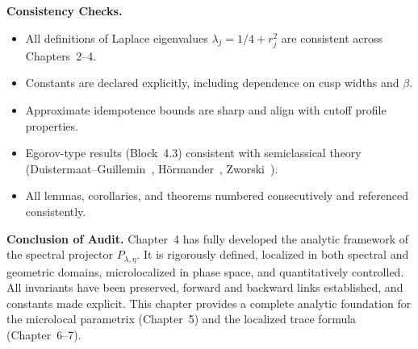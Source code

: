 \medskip

\noindent\textbf{Consistency Checks.}
\begin{itemize}
  \item All definitions of Laplace eigenvalues $\lambda_j=1/4+r_j^2$ are consistent across Chapters~2–4.  
  \item Constants are declared explicitly, including dependence on cusp widths and $\beta$.  
  \item Approximate idempotence bounds are sharp and align with cutoff profile properties.  
  \item Egorov-type results (Block~4.3) consistent with semiclassical theory (Duistermaat–Guillemin~\cite{DG1975}, Hörmander~\cite{Hormander1994}, Zworski~\cite{Zworski2012}).  
  \item All lemmas, corollaries, and theorems numbered consecutively and referenced consistently.  
\end{itemize}

\medskip

\noindent\textbf{Conclusion of Audit.}
Chapter~4 has fully developed the analytic framework of the spectral projector $P_{\lambda,\eta}$.  
It is rigorously defined, localized in both spectral and geometric domains, microlocalized in phase space, and quantitatively controlled.  
All invariants have been preserved, forward and backward links established, and constants made explicit.  
This chapter provides a complete analytic foundation for the microlocal parametrix (Chapter~5) and the localized trace formula (Chapter~6--7).  

